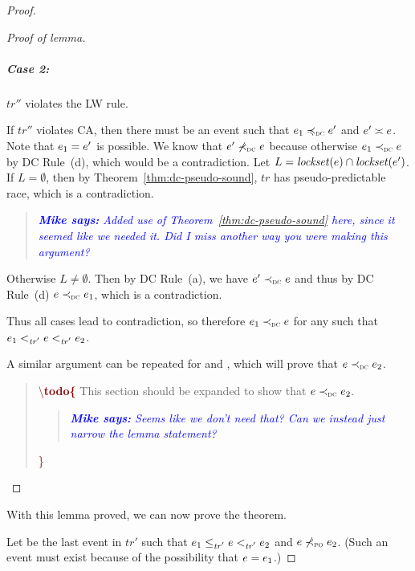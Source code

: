\documentclass[letter,10pt]{article}
\newcommand{\lockset}[1]{\ensuremath{\mathit{lockset}(#1)}\xspace}
\newcommand{\commonLocks}[2]{\ensuremath{\lockset{#1} \cap \lockset{#2}}}
\newcommand{\conflicts}[2]{\ensuremath{#1 \asymp #2}} %
\newcommand{\tr}{\ensuremath{\mathit{tr}}\xspace}
\newcommand{\trPrime}{\ensuremath{\mathit{tr'}}\xspace}
\newcommand{\trDoublePrime}{\ensuremath{\mathit{tr''}}\xspace}
\newcommand{\PO}{PO\xspace}
\newcommand{\WDC}{DC\xspace}
\newcommand{\DC}{\WDC}
\newcommand{\DCOrdered}[2]{\WDCOrdered{#1}{#2}}
\newcommand{\nDCOrdered}[2]{\nWDCOrdered{#1}{#2}}
\newcommand{\ltTR}{\ensuremath{<_\textsc{\tr}}\xspace}
\newcommand{\ltTRPrime}{\ensuremath{<_\textsc{\trPrime}}\xspace}
\newcommand{\ltEqTRPrime}{\ensuremath{\leq_\textsc{\trPrime}}\xspace}
\newcommand{\ltPO}{\ensuremath{\prec_\textsc{\tiny{\PO}}}\xspace}
\newcommand{\nltPO}{\ensuremath{\not\prec_\textsc{\tiny{\PO}}}\xspace}
\newcommand{\ltWDC}{\ensuremath{\prec_\textsc{\tiny{\WDC}}}\xspace}
\newcommand{\ltEqWDC}{\ensuremath{\preccurlyeq_\textsc{\tiny{\WDC}}}\xspace}
\newcommand{\nltWDC}{\ensuremath{\not\prec_\textsc{\tiny{\WDC}}}\xspace}
\newcommand{\Ordered}[3]{\ensuremath{#1 #2 #3}}
\newcommand{\TROrdered}[2]{\Ordered{#1}{\ltTR}{#2}}
\newcommand{\TRPrimeOrdered}[2]{\Ordered{#1}{\ltTRPrime}{#2}}
\newcommand{\EqTRPrimeOrdered}[2]{\Ordered{#1}{\ltEqTRPrime}{#2}}
\newcommand{\POOrdered}[2]{\Ordered{#1}{\ltPO}{#2}}
\newcommand{\nPOOrdered}[2]{\Ordered{#1}{\nltPO}{#2}}
\newcommand{\WDCOrdered}[2]{\Ordered{#1}{\ltWDC}{#2}}
\newcommand{\EqWDCOrdered}[2]{\Ordered{#1}{\ltEqWDC}{#2}}
\newcommand{\nWDCOrdered}[2]{\Ordered{#1}{\nltWDC}{#2}}
\newcommand\todo[1]{\begin{quote}\textcolor{darkred}{\textbackslash \textbf{todo\{}} #1 \textcolor{darkred}{\}}\end{quote}}
\newcommand{\originalgrumbler}[2]{\begin{quote}\textcolor{blue}{\sl{\bf #1 says:} #2}\end{quote}}
\newcommand{\grumbler}[2]{\originalgrumbler{#1}{#2}}
\newcommand{\mike}[1]{\grumbler{Mike}{#1}}
\begin{document}
\begin{proof}
\begin{proof}[Proof of lemma]
  \subparagraph{Case 2:}
  \trDoublePrime violates the LW rule.
  
  If \trDoublePrime violates CA,
  then there must be an event  such that
  \EqWDCOrdered{\event{e}{_1}}{\event{e}{'}} and
  \conflicts{\event{e}{'}}{\event{e}}. Note that $\event{e}{_1}=\event{e}{'}$ is
  possible.
  We know that \nDCOrdered{\event{e}{'}}{\event{e}} because otherwise \DCOrdered{\event{e}{_1}}{\event{e}} by \DC Rule~(d),
  which would be a contradiction.
  Let $L=\commonLocks{\event{e}{}}{\event{e}{'}}$. If $L=\emptyset$,
  then by Theorem~\ref{thm:dc-pseudo-sound}, \tr has pseudo-predictable race,
  which is a contradiction.
  \mike{Added use of Theorem~\ref{thm:dc-pseudo-sound} here, since it seemed like we needed it. Did I miss another way you were making this argument?}
  
  Otherwise
  $L\neq\emptyset$.
  Then by \DC Rule~(a), we have \DCOrdered{\event{e}{'}}{\event{e}} and thus
  by \DC Rule~(d) \DCOrdered{\event{e}}{\event{e}{_1}}, which is a contradiction.

  \medskip
  \noindent
  Thus all cases lead to contradiction, so therefore
  \DCOrdered{\event{e}{_1}}{\event{e}} for any  such that
  \TRPrimeOrdered{\event{e}{_1}}{\TRPrimeOrdered{\event{e}}{\event{e}{_2}}}.

  A similar argument can be repeated for  and , which will
  prove that \DCOrdered{\event{e}}{\event{e}{_2}}.
  \todo{This section should be expanded to show that
    \DCOrdered{\event{e}}{\event{e}{_2}}.
  \mike{Seems like we don't need that? Can we instead just narrow the lemma statement?}}
\end{proof}

\noindent
With this lemma proved,
we can now prove the theorem.


Let  be the last event in \trPrime such that
\EqTRPrimeOrdered{\event{e}{_1}}{\TRPrimeOrdered{\event{e}}{\event{e}{_2}}}
and \nPOOrdered{\event{e}}{\event{e}{_2}}.
(Such an event must exist because of the possibility that $\event{e} = \event{e}{_1}$.)


\end{proof}
\end{document}
